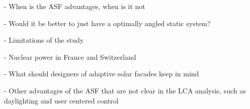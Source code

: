 
- When is the ASF advantages, when is it not

- Would it be better to just have a optimally angled static system?

- Limitations of the study

- Nuclear power in France and Switzerland

- What should designers of adaptive solar facades keep in mind 

- Other advantages of the ASF that are not clear in the LCA analysis, such as daylighting and user centered control 